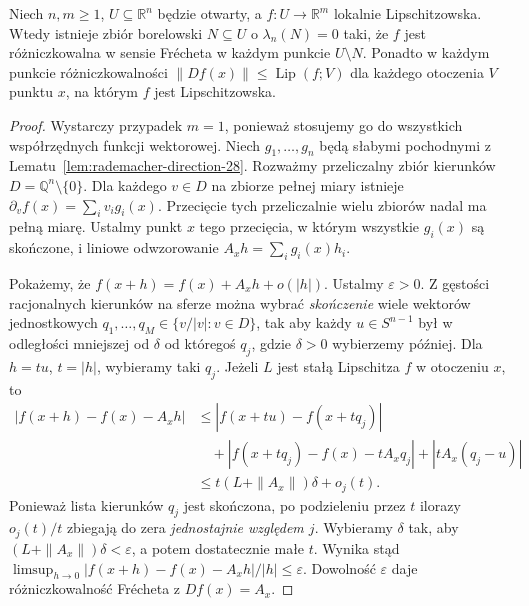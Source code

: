 \begin{twierdzenie}[Rademacher]
\label{thm:rademacher-28}
Niech $n,m\ge1$, $U\subseteq\mathbb R^n$ będzie
otwarty, a $f:U\to\mathbb R^m$ lokalnie Lipschitzowska.
Wtedy istnieje zbiór borelowski $N\subseteq U$ o
$\lambda_n(N)=0$ taki, że $f$ jest różniczkowalna
w sensie Frécheta w każdym punkcie $U\setminus N$.
Ponadto w każdym punkcie różniczkowalności
$\|Df(x)\|\le\operatorname{Lip}(f;V)$ dla
każdego otoczenia $V$ punktu $x$, na którym $f$
jest Lipschitzowska.
\end{twierdzenie}
\begin{proof}
Wystarczy przypadek $m=1$, ponieważ stosujemy go
do wszystkich współrzędnych funkcji wektorowej.
Niech $g_1,\ldots,g_n$ będą słabymi pochodnymi z
Lematu~\ref{lem:rademacher-direction-28}. Rozważmy
przeliczalny zbiór kierunków $D=\mathbb Q^n\setminus\{0\}$.
Dla każdego $v\in D$ na zbiorze pełnej miary
istnieje $\partial_v f(x)=\sum_i v_i g_i(x)$.
Przecięcie tych przeliczalnie wielu zbiorów nadal
ma pełną miarę. Ustalmy punkt $x$ tego przecięcia,
w którym wszystkie $g_i(x)$ są skończone, i liniowe
odwzorowanie $A_xh=\sum_i g_i(x)h_i$.

Pokażemy, że $f(x+h)=f(x)+A_xh+o(|h|)$.
Ustalmy $\varepsilon>0$. Z gęstości racjonalnych
kierunków na sferze można wybrać \emph{skończenie}
wiele wektorów jednostkowych
$q_1,\ldots,q_M\in\{v/|v|:v\in D\}$, tak aby
każdy $u\in S^{n-1}$ był w odległości mniejszej
od $\delta$ od któregoś $q_j$, gdzie
$\delta>0$ wybierzemy później. Dla $h=tu$, $t=|h|$,
wybieramy taki $q_j$. Jeżeli $L$ jest stałą
Lipschitza $f$ w otoczeniu $x$, to
\begin{align*}
 |f(x+h)-f(x)-A_xh|
 &\le |f(x+tu)-f(x+tq_j)|\\
 &\quad+|f(x+tq_j)-f(x)-tA_xq_j|
       +|tA_x(q_j-u)|\\
 &\le t(L+\|A_x\|)\delta+o_j(t).
\end{align*}
Ponieważ lista kierunków $q_j$ jest skończona,
po podzieleniu przez $t$ ilorazy $o_j(t)/t$
zbiegają do zera \emph{jednostajnie względem $j$}.
Wybieramy $\delta$ tak, aby
$(L+\|A_x\|)\delta<\varepsilon$, a potem
dostatecznie małe $t$. Wynika stąd
$\limsup_{h\to0}|f(x+h)-f(x)-A_xh|/|h|\le\varepsilon$.
Dowolność $\varepsilon$ daje różniczkowalność
Frécheta z $Df(x)=A_x$.


\end{proof}
